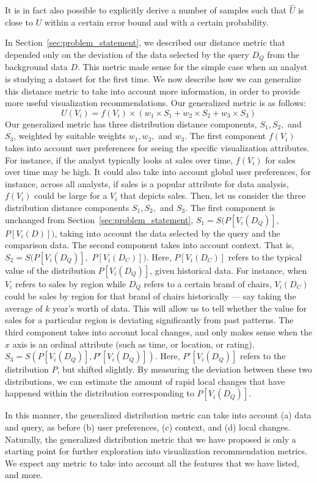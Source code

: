 It is in fact also possible to explicitly derive a number of samples 
such that $\hat{U}$ is close to $U$ within a certain error bound
and with a certain probability. 




\label{sec:general-metric}
In Section~\ref{sec:problem_statement}, we described our
distance metric that depended only on the deviation of the data selected
by the query $D_Q$ from the background data $D$.
This metric made sense for the simple case
when an analyst is studying a dataset for the first time.
We now describe how we can generalize this distance
metric to take into account more information,
in order to provide more useful visualization recommendations.
Our generalized metric is as follows:
$$ U (V_i) = f(V_i) \times (w_1\times S_1 + w_2 \times S_2 + w_3 \times S_3)$$
Our generalized metric has three distribution
distance components, $S_1, S_2,$ and $S_3$,
weighted by suitable weights $w_1, w_2,$ and $w_3$.
The first component $f(V_i)$ takes into
account user preferences for seeing the specific 
visualization attributes.
For instance, if the analyst typically looks at
sales over time, $f(V_i)$ for sales over time
may be high.
It could also take into account global user preferences,
for instance, across all analysts, if sales is a popular
attribute for data analysis, $f(V_i)$ could be large for
a $V_i$ that depicts sales.
Then, let us consider the three distribution distance
components $S_1, S_2,$ and $S_3$.
The first component is unchanged from Section~\ref{sec:problem_statement},
$S_1 = S ( P[V_i (D_Q)],$ $P[V_i (D)] )$,
taking into account the data selected by the query and
the comparison data.
The second component takes into account context.
That is, $S_2 = S ( P[V_i (D_Q)], $ $P[V_i (D_C)] )$.
Here, $P[V_i (D_C)]$ refers to the typical value of the distribution 
$P[V_i (D_Q)]$,
given historical data.
For instance, when $V_i$ refers to sales by
region while $D_Q$ refers to a certain brand of chairs,
$V_i(D_C)$ could be sales by region for that brand of chairs
historically --- say taking the average of $k$ year's worth of data.
This will allow us to tell whether the value for sales for a particular
region is deviating significantly from past patterns.
The third component takes into account local changes,
and only makes sense when the $x$ axis is an ordinal attribute
(such as time, or location, or rating).
$S_3 = S ( P[V_i (D_Q)], P'[V_i (D_Q)] )$.
Here, $P'[V_i (D_Q)]$ refers to the distribution $P$, but shifted slightly.
By measuring the deviation between these two distributions,
we can estimate the amount of rapid local changes that have happened
within the distribution corresponding to $P[V_i (D_Q)]$.

In this manner, the generalized distribution metric can take into
account (a) data and query, as before
(b) user preferences, (c) context,
and (d) local changes.
Naturally, the generalized distribution metric that
we have proposed is only a starting point for further exploration
into visualization recommendation metrics.
We expect any metric to take into account all the features
that we have listed, and more.






